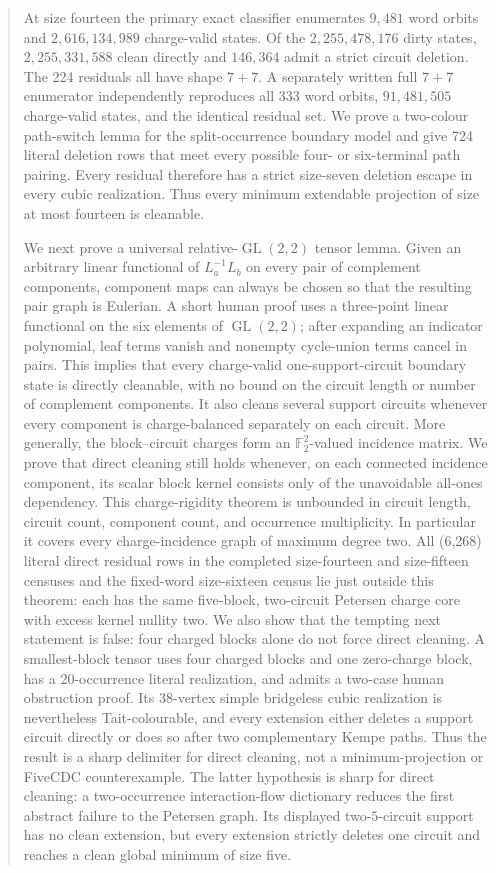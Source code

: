 \documentclass[11pt]{article}
\theoremstyle{definition}
\theoremstyle{remark}
\newcommand{\F}{\mathbb F}
\begin{document}
\begin{abstract}
At size fourteen the primary exact classifier enumerates \(9{,}481\)
word orbits and \(2{,}616{,}134{,}989\) charge-valid states.  Of the
\(2{,}255{,}478{,}176\) dirty states, \(2{,}255{,}331{,}588\) clean
directly and \(146{,}364\) admit a strict circuit deletion.  The 224
residuals all have shape \(7+7\).  A separately written full
\(7+7\) enumerator independently reproduces all 333 word orbits,
\(91{,}481{,}505\) charge-valid states, and the identical residual set.
We prove a two-colour path-switch lemma for the split-occurrence boundary
model and give 724 literal deletion rows that meet every possible
four- or six-terminal path pairing.  Every residual therefore has a strict
size-seven deletion escape in every cubic realization.  Thus every
minimum extendable projection of size at most fourteen is cleanable.

We next prove a universal relative-\(\operatorname{GL}(2,2)\) tensor
lemma.  Given an arbitrary linear functional of \(L_a^{-1}L_b\) on every
pair of complement components, component maps can always be chosen so
that the resulting pair graph is Eulerian.  A short human proof uses a
three-point linear functional on the six elements of
\(\operatorname{GL}(2,2)\); after expanding an indicator polynomial,
leaf terms vanish and nonempty cycle-union terms cancel in pairs.  This
implies that every charge-valid one-support-circuit boundary state is
directly cleanable, with no bound on the circuit length or number of
complement components.  It also cleans several support circuits whenever
every component is charge-balanced separately on each circuit.
More generally, the block--circuit charges form an
\(\F_2^2\)-valued incidence matrix.  We prove that direct cleaning still
holds whenever, on each connected incidence component, its scalar block
kernel consists only of the unavoidable all-ones dependency.  This
charge-rigidity theorem is unbounded in circuit length, circuit count,
component count, and occurrence multiplicity.  In particular it covers
every charge-incidence graph of maximum degree two.  All (6{,}268)
literal direct residual rows in the completed size-fourteen and
size-fifteen censuses and the fixed-word size-sixteen census lie just
outside this theorem: each has the same five-block, two-circuit Petersen
charge core with excess kernel nullity two.
We also show that the tempting next statement is false: four charged
blocks alone do not force direct cleaning.  A smallest-block tensor uses
four charged blocks and one zero-charge block, has a 20-occurrence literal
realization, and admits a two-case human obstruction proof.  Its
38-vertex simple bridgeless cubic realization is nevertheless
Tait-colourable, and every extension either deletes a support circuit
directly or does so after two complementary Kempe paths.  Thus the result
is a sharp delimiter for direct cleaning, not a minimum-projection or
FiveCDC counterexample.
The latter hypothesis is sharp for direct cleaning: a two-occurrence
interaction-flow dictionary reduces the first abstract failure to the
Petersen graph.  Its displayed two-\(5\)-circuit support has no clean
extension, but every extension strictly deletes one circuit and reaches
a clean global minimum of size five.


\end{abstract}
\end{document}
